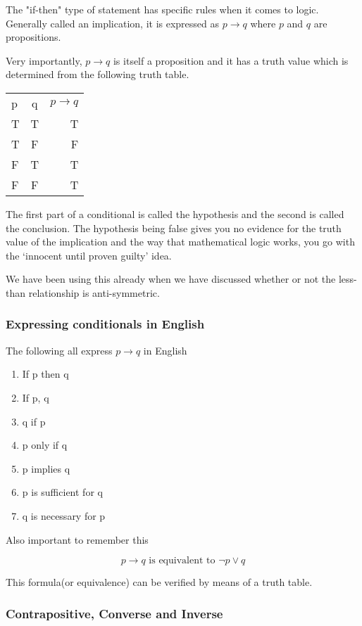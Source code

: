 \documentclass[12pt]{article}
\begin{document}
The "if-then" type of statement has specific rules when it comes to logic. Generally called an implication, it is expressed as $p \rightarrow q$ where $p$ and $q$ are propositions.

Very importantly, $p \rightarrow q$ is itself a proposition and it has a truth value which is determined from the following truth table.

\begin{tabular} {l c r}
p & q & $p \rightarrow q$ \\
T & T & T \\
T & F & F \\
F & T & T \\
F & F & T
\end{tabular}

The first part of a conditional is called the hypothesis and the second is called the conclusion. The hypothesis being false gives you no evidence for the truth value of the implication and the way that mathematical logic works, you go with the `innocent until proven guilty' idea. 

We have been using this already when we have discussed whether or not the less-than relationship is anti-symmetric. 

\subsubsection*{Expressing conditionals in English}

The following all express $p \rightarrow q$ in English

\begin{enumerate}
\item If p then q
\item If p, q
\item q if p
\item p only if q
\item p implies q
\item p is sufficient for q
\item q is necessary for p
\end{enumerate}

Also important to remember this 

\begin{equation*}
p \rightarrow q \text{ is equivalent to } \neg p \vee q
\end{equation*}

This formula(or equivalence) can be verified by means of a truth table.

\subsubsection*{Contrapositive, Converse and Inverse}
\end{document}
